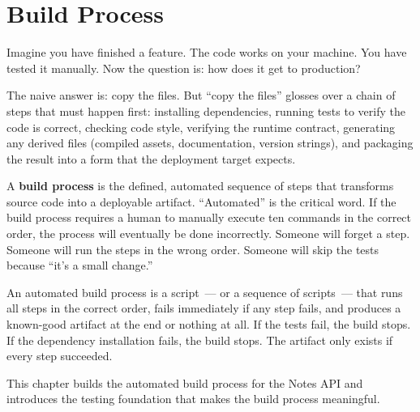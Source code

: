 \setcounter{chapter}{16}
\chapter{Build Process}\label{ch:17-build-process}

\chapterrule

Imagine you have finished a feature. The code works on your machine. You have tested it manually. Now the question is: how does it get to production?

The naive answer is: copy the files. But ``copy the files'' glosses over a chain of steps that must happen first: installing dependencies, running tests to verify the code is correct, checking code style, verifying the runtime contract, generating any derived files (compiled assets, documentation, version strings), and packaging the result into a form that the deployment target expects.

A \textbf{build process} is the defined, automated sequence of steps that transforms source code into a deployable artifact. ``Automated'' is the critical word. If the build process requires a human to manually execute ten commands in the correct order, the process will eventually be done incorrectly. Someone will forget a step. Someone will run the steps in the wrong order. Someone will skip the tests because ``it's a small change.''

An automated build process is a script~--- or a sequence of scripts~--- that runs all steps in the correct order, fails immediately if any step fails, and produces a known-good artifact at the end or nothing at all. If the tests fail, the build stops. If the dependency installation fails, the build stops. The artifact only exists if every step succeeded.

This chapter builds the automated build process for the Notes API and introduces the testing foundation that makes the build process meaningful.

